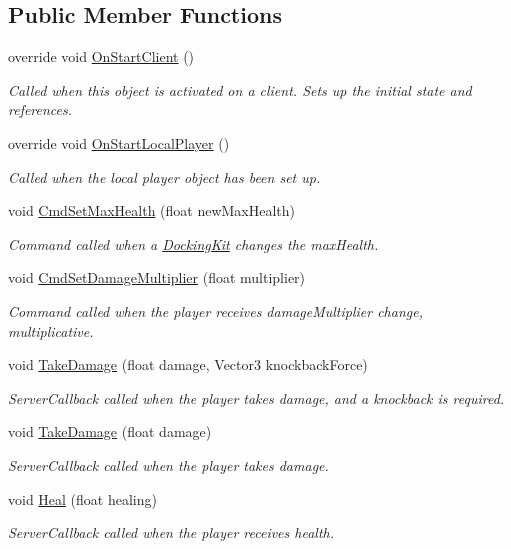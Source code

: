 \subsection*{Public Member Functions}
\begin{DoxyCompactItemize}
\item 
override void \hyperlink{class_player_health_ad2740e9dc726d6ac4931a08514ec64ff}{On\+Start\+Client} ()
\begin{DoxyCompactList}\small\item\em Called when this object is activated on a client. Sets up the initial state and references. \end{DoxyCompactList}\item 
override void \hyperlink{class_player_health_aeff542368fc096a315d75a358055b058}{On\+Start\+Local\+Player} ()
\begin{DoxyCompactList}\small\item\em Called when the local player object has been set up. \end{DoxyCompactList}\item 
void \hyperlink{class_player_health_a568025d9187065c164ef7946654e0504}{Cmd\+Set\+Max\+Health} (float new\+Max\+Health)
\begin{DoxyCompactList}\small\item\em Command called when a \hyperlink{class_docking_kit}{Docking\+Kit} changes the max\+Health. \end{DoxyCompactList}\item 
void \hyperlink{class_player_health_a799bc1eb8d1a4bdb7be804d9e87d87fc}{Cmd\+Set\+Damage\+Multiplier} (float multiplier)
\begin{DoxyCompactList}\small\item\em Command called when the player receives damage\+Multiplier change, multiplicative. \end{DoxyCompactList}\item 
void \hyperlink{class_player_health_a4572180d6148cb25bced17d5990927aa}{Take\+Damage} (float damage, Vector3 knockback\+Force)
\begin{DoxyCompactList}\small\item\em Server\+Callback called when the player takes damage, and a knockback is required. \end{DoxyCompactList}\item 
void \hyperlink{class_player_health_a92faabb0dfe53cdbdd4ba7ab2b51b6dc}{Take\+Damage} (float damage)
\begin{DoxyCompactList}\small\item\em Server\+Callback called when the player takes damage. \end{DoxyCompactList}\item 
void \hyperlink{class_player_health_aae2aa8c904faf746f30ea39c5a9e76ae}{Heal} (float healing)
\begin{DoxyCompactList}\small\item\em Server\+Callback called when the player receives health. \end{DoxyCompactList}\end{DoxyCompactItemize}
